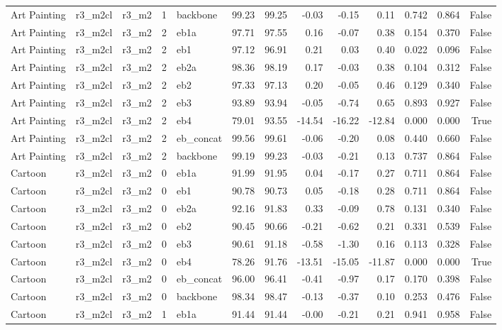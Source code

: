 \begin{table}
\begin{tabular}{lllrlrrrrrllr}
Art Painting & r3\_m2cl & r3\_m2 & 1 & backbone & 99.23 & 99.25 & -0.03 & -0.15 & 0.11 & 0.742 & 0.864 & False \\
Art Painting & r3\_m2cl & r3\_m2 & 2 & eb1a & 97.71 & 97.55 & 0.16 & -0.07 & 0.38 & 0.154 & 0.370 & False \\
Art Painting & r3\_m2cl & r3\_m2 & 2 & eb1 & 97.12 & 96.91 & 0.21 & 0.03 & 0.40 & 0.022 & 0.096 & False \\
Art Painting & r3\_m2cl & r3\_m2 & 2 & eb2a & 98.36 & 98.19 & 0.17 & -0.03 & 0.38 & 0.104 & 0.312 & False \\
Art Painting & r3\_m2cl & r3\_m2 & 2 & eb2 & 97.33 & 97.13 & 0.20 & -0.05 & 0.46 & 0.129 & 0.340 & False \\
Art Painting & r3\_m2cl & r3\_m2 & 2 & eb3 & 93.89 & 93.94 & -0.05 & -0.74 & 0.65 & 0.893 & 0.927 & False \\
Art Painting & r3\_m2cl & r3\_m2 & 2 & eb4 & 79.01 & 93.55 & -14.54 & -16.22 & -12.84 & 0.000 & 0.000 & True \\
Art Painting & r3\_m2cl & r3\_m2 & 2 & eb\_concat & 99.56 & 99.61 & -0.06 & -0.20 & 0.08 & 0.440 & 0.660 & False \\
Art Painting & r3\_m2cl & r3\_m2 & 2 & backbone & 99.19 & 99.23 & -0.03 & -0.21 & 0.13 & 0.737 & 0.864 & False \\
Cartoon & r3\_m2cl & r3\_m2 & 0 & eb1a & 91.99 & 91.95 & 0.04 & -0.17 & 0.27 & 0.711 & 0.864 & False \\
Cartoon & r3\_m2cl & r3\_m2 & 0 & eb1 & 90.78 & 90.73 & 0.05 & -0.18 & 0.28 & 0.711 & 0.864 & False \\
Cartoon & r3\_m2cl & r3\_m2 & 0 & eb2a & 92.16 & 91.83 & 0.33 & -0.09 & 0.78 & 0.131 & 0.340 & False \\
Cartoon & r3\_m2cl & r3\_m2 & 0 & eb2 & 90.45 & 90.66 & -0.21 & -0.62 & 0.21 & 0.331 & 0.539 & False \\
Cartoon & r3\_m2cl & r3\_m2 & 0 & eb3 & 90.61 & 91.18 & -0.58 & -1.30 & 0.16 & 0.113 & 0.328 & False \\
Cartoon & r3\_m2cl & r3\_m2 & 0 & eb4 & 78.26 & 91.76 & -13.51 & -15.05 & -11.87 & 0.000 & 0.000 & True \\
Cartoon & r3\_m2cl & r3\_m2 & 0 & eb\_concat & 96.00 & 96.41 & -0.41 & -0.97 & 0.17 & 0.170 & 0.398 & False \\
Cartoon & r3\_m2cl & r3\_m2 & 0 & backbone & 98.34 & 98.47 & -0.13 & -0.37 & 0.10 & 0.253 & 0.476 & False \\
Cartoon & r3\_m2cl & r3\_m2 & 1 & eb1a & 91.44 & 91.44 & -0.00 & -0.21 & 0.21 & 0.941 & 0.958 & False \\

\end{tabular}
\end{table}
